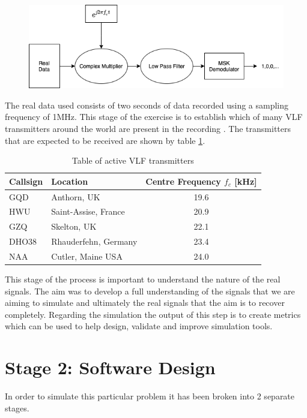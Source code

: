 \begin{figure}[h!]
    \centering
    \includegraphics[width = \textwidth]{figs/method/downconversion.png}
    \caption{}
    \label{fig:downconversion}
\end{figure}

The real data used consists of two seconds of data recorded using a sampling frequency of 1\si{\mega\hertz}. This stage of the exercise is to establish which of many VLF transmitters around the world are present in the recording \cite{wikipediaVLF}. The transmitters that are expected to be received are shown by table \ref{tab:vlftransmitters}.

\begin{table}[h!]
\centering
\begin{tabular}{l|l|c}
\textbf{Callsign} & \textbf{Location}    & \textbf{Centre Frequency $f_c$ [kHz]} \\
\hline 
GQD               & Anthorn, UK          & 19.6                            \\
HWU               & Saint-Assise, France & 20.9                            \\
GZQ               & Skelton, UK          & 22.1                            \\
DHO38             & Rhauderfehn, Germany & 23.4                            \\
NAA               & Cutler, Maine USA    & 24.0                             
\end{tabular}
\caption{Table of active VLF transmitters}
\label{tab:vlftransmitters}
\end{table}

This stage of the process is important to understand the nature of the real signals. The aim was to develop a full understanding of the signals that we are aiming to simulate and ultimately the real signals that the aim is to recover completely. Regarding the simulation the output of this step is to create metrics which can be used to help design, validate and improve simulation tools.

\section{Stage 2: Software Design}
In order to simulate this particular problem it has been broken into 2 separate stages.
